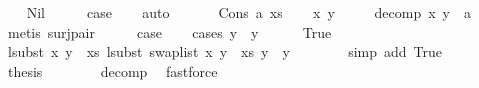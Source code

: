 \begin{isabellebody}
\ \ \isamarkupfalse%
\ Nil\isanewline
\ \ \isamarkupfalse%
\ \isamarkupfalse%
\ {\isacharquery}{\kern0pt}case\isanewline
\ \ \isamarkupfalse%
\ auto\isanewline
\ \ \isamarkupfalse%
\isanewline
{}\isamarkupfalse%
\isanewline
\ \ \isamarkupfalse%
\ {\isacharparenleft}{\kern0pt}Cons\ a\ xs{\isacharparenright}{\kern0pt}\isanewline
\ \ \isamarkupfalse%
\ x\ y{\isacharprime}{\kern0pt}\ \isanewline
\ \ \ \ decomp{\isacharcolon}{\kern0pt}\ {\isachardoublequoteopen}{\isacharparenleft}{\kern0pt}x{\isacharcomma}{\kern0pt}\ y{\isacharprime}{\kern0pt}{\isacharparenright}{\kern0pt}\ {\isacharequal}{\kern0pt}\ a{\isachardoublequoteclose}\isanewline
\ \ \isamarkupfalse%
\ {\isacharparenleft}{\kern0pt}metis\ surj{\isacharunderscore}{\kern0pt}pair{\isacharparenright}{\kern0pt}\isanewline
\isanewline
\ \ \isamarkupfalse%
\ \isamarkupfalse%
\ {\isacharquery}{\kern0pt}case\isanewline
\ \ \isamarkupfalse%
\ {\isacharparenleft}{\kern0pt}cases\ {\isachardoublequoteopen}y\ {\isacharequal}{\kern0pt}\ y{\isacharprime}{\kern0pt}{\isachardoublequoteclose}{\isacharparenright}{\kern0pt}\isanewline
\ \ \ \ \isamarkupfalse%
\ True\isanewline
\ \ \ \ \isamarkupfalse%
\ {\isachardoublequoteopen}lsubst\ {\isacharparenleft}{\kern0pt}{\isacharparenleft}{\kern0pt}x{\isacharcomma}{\kern0pt}\ y{\isacharprime}{\kern0pt}{\isacharparenright}{\kern0pt}\ {\isacharhash}{\kern0pt}\ xs{\isacharparenright}{\kern0pt}\ {\isacharparenleft}{\kern0pt}lsubst\ {\isacharparenleft}{\kern0pt}swap{\isacharunderscore}{\kern0pt}list\ {\isacharparenleft}{\kern0pt}{\isacharparenleft}{\kern0pt}x{\isacharcomma}{\kern0pt}\ y{\isacharprime}{\kern0pt}{\isacharparenright}{\kern0pt}\ {\isacharhash}{\kern0pt}\ xs{\isacharparenright}{\kern0pt}{\isacharparenright}{\kern0pt}\ y{\isacharparenright}{\kern0pt}\ {\isacharequal}{\kern0pt}\ y{\isachardoublequoteclose}\isanewline
\ \ \ \ \ \ \isamarkupfalse%
\ {\isacharparenleft}{\kern0pt}simp\ add{\isacharcolon}{\kern0pt}\ True{\isacharparenright}{\kern0pt}\isanewline
\ \ \ \ \isamarkupfalse%
\ \isamarkupfalse%
\ {\isacharquery}{\kern0pt}thesis\isanewline
\ \ \ \ \ \ \isamarkupfalse%
\ decomp\ \isamarkupfalse%
\ fastforce\isanewline
\ \ \isamarkupfalse%
\isanewline

\end{isabellebody}
